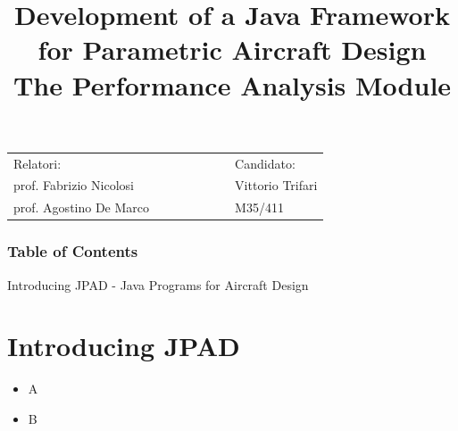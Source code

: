 \documentclass[11pt]{beamer}
\title{Development of a Java Framework for Parametric Aircraft Design\\
\bigskip
The Performance Analysis Module}
\date{}
\newcommand*\MyBullet{%
  \item[\color{blue}\scalebox{0.9}{\textbullet}]}
\newif\ifplacelogo
\newif\ifplacebackground
\begin{document}
%
\placelogofalse
\placebackgroundtrue
\begin{frame}
\titlepage
\begin{table}
\begin{tabular}{p{0.7\linewidth}p{0.7\linewidth}}
Relatori: &  Candidato: \\
prof. Fabrizio Nicolosi & Vittorio Trifari \\
prof. Agostino De Marco &  M35/411 \\
\end{tabular}
\end{table}
\end{frame}
%
\placelogotrue
\placebackgroundfalse
\begin{frame}
\frametitle{Table of Contents}
\tableofcontents
\end{frame}
%
\placelogotrue
\placebackgroundfalse
\begin{frame}{Introducing JPAD - Java Programs for Aircraft Design}
\section{Introducing JPAD}
\begin{itemize}
\MyBullet A
\MyBullet B
\end{itemize}

\end{frame}
%
\placelogotrue
\placebackgroundfalse
\end{document}
